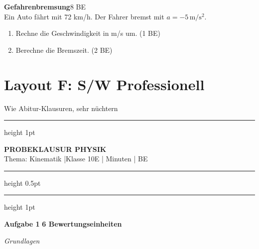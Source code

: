 \documentclass[11pt,a4paper]{article}
\begin{document}
\vspace{0.8cm}

\noindent
{}
\hspace{0.3cm}
\begin{minipage}[t]{0.85\textwidth}
{\bfseries Gefahrenbremsung}\hfill{\small 8 BE}\\[0.2cm]
Ein Auto fährt mit 72 km/h. Der Fahrer bremst mit $a = -5\,\mathrm{m/s^2}$.
\begin{enumerate}
\item[a)] Rechne die Geschwindigkeit in m/s um. \hfill (1 BE)
\item[b)] Berechne die Bremszeit. \hfill (2 BE)
\end{enumerate}
\end{minipage}

\vspace{1cm}

\newpage
\section*{Layout F: S/W Professionell}
\vspace{-0.3cm}
{\small Wie Abitur-Klausuren, sehr nüchtern}

\vspace{0.5cm}

\hrule height 1pt
\vspace{0.3cm}
\begin{center}
{\large\bfseries PROBEKLAUSUR PHYSIK}\\[0.1cm]
{\small Thema: Kinematik \quad|\quad Klasse 10E \quad| Minuten \quad| BE}
\end{center}
\vspace{0.2cm}
\hrule height 0.5pt
\vspace{0.1cm}
\hrule height 1pt

\vspace{0.8cm}

\noindent\textbf{Aufgabe 1} \hfill \textbf{6 Bewertungseinheiten}

\vspace{0.2cm}
\textit{Grundlagen}
\end{document}

